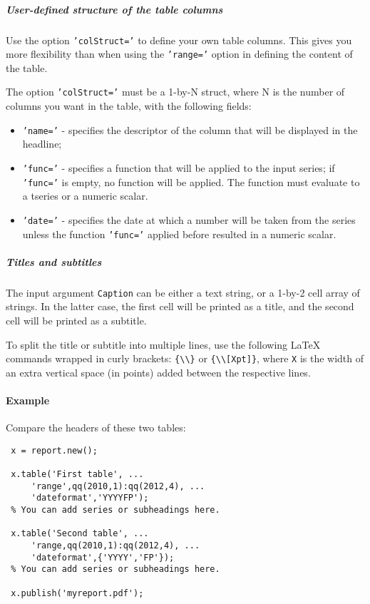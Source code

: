  \subparagraph{User-defined structure of the table columns}
 
 Use the option \texttt{'colStruct='} to define your own table columns.
 This gives you more flexibility than when using the \texttt{'range='}
 option in defining the content of the table.
 
 The option \texttt{'colStruct='} must be a 1-by-N struct, where N is the
 number of columns you want in the table, with the following fields:
 
 \begin{itemize}
 \item
   \texttt{'name='} - specifies the descriptor of the column that will be
   displayed in the headline;
 \item
   \texttt{'func='} - specifies a function that will be applied to the
   input series; if \texttt{'func='} is empty, no function will be
   applied. The function must evaluate to a tseries or a numeric scalar.
 \item
   \texttt{'date='} - specifies the date at which a number will be taken
   from the series unless the function \texttt{'func='} applied before
   resulted in a numeric scalar.
 \end{itemize}
 
 \subparagraph{Titles and subtitles}
 
 The input argument \texttt{Caption} can be either a text string, or a
 1-by-2 cell array of strings. In the latter case, the first cell will be
 printed as a title, and the second cell will be printed as a subtitle.
 
 To split the title or subtitle into multiple lines, use the following
 LaTeX commands wrapped in curly brackets:
 \texttt{\{\textbackslash{}\textbackslash{}\}} or
 \texttt{\{\textbackslash{}\textbackslash{}{[}Xpt{]}\}}, where \texttt{X}
 is the width of an extra vertical space (in points) added between the
 respective lines.
 
 \paragraph{Example}
 
 Compare the headers of these two tables:
 
 \begin{verbatim}
 x = report.new();
 
 x.table('First table', ...
     'range',qq(2010,1):qq(2012,4), ...
     'dateformat','YYYYFP');
 % You can add series or subheadings here.
 
 x.table('Second table', ...
     'range,qq(2010,1):qq(2012,4), ...
     'dateformat',{'YYYY','FP'});
 % You can add series or subheadings here.
 
 x.publish('myreport.pdf');
 \end{verbatim}


